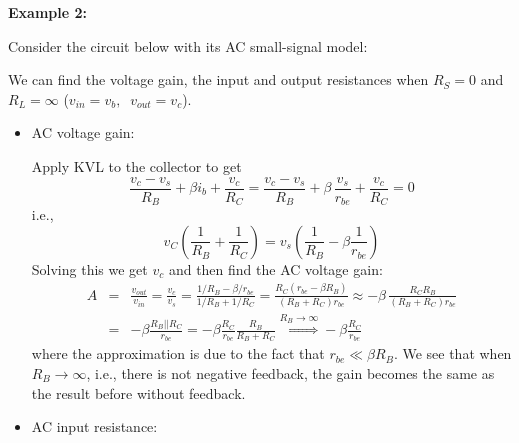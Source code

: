 \documentclass{article}
\begin{document}
{\bf Example 2:}

Consider the circuit below with its AC small-signal model:


We can find the voltage gain, the input and output resistances when 
$R_S=0$ and $R_L=\infty$ ($v_{in}=v_b,\;\;v_{out}=v_c$).
\begin{itemize}
\item AC voltage gain:

  Apply KVL to the collector to get
  \begin{equation}
  \frac{v_c-v_s}{R_B}+\beta i_b+\frac{v_c}{R_C}
  =\frac{v_c-v_s}{R_B}+\beta \,\frac{v_s}{r_{be}}+\frac{v_c}{R_C}=0  
  \end{equation}
  i.e.,
  \begin{equation}
  v_C\left(\frac{1}{R_B}+\frac{1}{R_C}\right)
  =v_s\left(\frac{1}{R_B}-\beta\frac{1}{r_{be}}\right)
  \end{equation}
  Solving this we get $v_c$ and then find the AC voltage gain:
  \begin{eqnarray}
  A&=&\frac{v_{out}}{v_{in}}=\frac{v_c}{v_s}
  =\frac{1/R_B-\beta/r_{be}}{1/R_B+1/R_C}=\frac{R_C(r_{be}-\beta R_B)}{(R_B+R_C)r_{be}}
  \approx-\beta \,\frac{R_C R_B}{(R_B+R_C)r_{be}}
  \nonumber\\
  &=&-\beta \frac{R_B||R_C}{r_{be}}=-\beta\frac{R_C}{r_{be}}\frac{R_B}{R_B+R_C}
  \stackrel{R_B\rightarrow\infty}{\Longrightarrow}-\beta\frac{R_C}{r_{be}}   
  \end{eqnarray}
  where the approximation is due to the fact that $r_{be}\ll \beta R_B$.
  We see that when $R_B\rightarrow\infty$, i.e., there is not negative
  feedback, the gain becomes the same as the result before without feedback.

\item AC input resistance:


\end{itemize}
\end{document}

